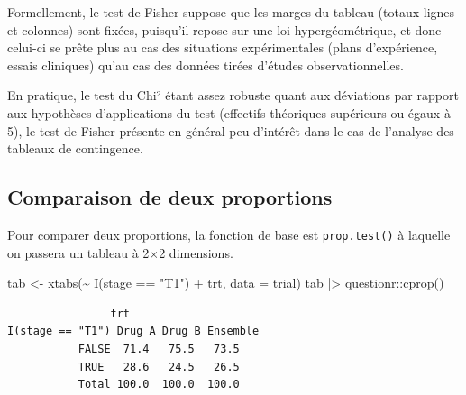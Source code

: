 \documentclass[
  letterpaper,
  DIV=11,
  numbers=noendperiod,
  oneside]{scrreprt}
\newenvironment{Shaded}{\begin{snugshade}}{\end{snugshade}}
\newcommand{\AttributeTok}[1]{\textcolor[rgb]{0.40,0.45,0.13}{#1}}
\newcommand{\FunctionTok}[1]{\textcolor[rgb]{0.28,0.35,0.67}{#1}}
\newcommand{\NormalTok}[1]{\textcolor[rgb]{0.00,0.23,0.31}{#1}}
\newcommand{\OtherTok}[1]{\textcolor[rgb]{0.00,0.23,0.31}{#1}}
\newcommand{\SpecialCharTok}[1]{\textcolor[rgb]{0.37,0.37,0.37}{#1}}
\newcommand{\StringTok}[1]{\textcolor[rgb]{0.13,0.47,0.30}{#1}}
\begin{document}
\begin{tcolorbox}[enhanced jigsaw, colbacktitle=quarto-callout-note-color!10!white, opacityback=0, toprule=.15mm, colback=white, coltitle=black, bottomtitle=1mm, toptitle=1mm, titlerule=0mm, rightrule=.15mm, title=\textcolor{quarto-callout-note-color}{\faInfo}\hspace{0.5em}{Note}, breakable, bottomrule=.15mm, opacitybacktitle=0.6, arc=.35mm, left=2mm, leftrule=.75mm, colframe=quarto-callout-note-color-frame]

Formellement, le test de Fisher suppose que les marges du tableau
(totaux lignes et colonnes) sont fixées, puisqu'il repose sur une loi
hypergéométrique, et donc celui-ci se prête plus au cas des situations
expérimentales (plans d'expérience, essais cliniques) qu'au cas des
données tirées d'études observationnelles.

En pratique, le test du Chi² étant assez robuste quant aux déviations
par rapport aux hypothèses d'applications du test (effectifs théoriques
supérieurs ou égaux à 5), le test de Fisher présente en général peu
d'intérêt dans le cas de l'analyse des tableaux de contingence.

\end{tcolorbox}

\hypertarget{comparaison-de-deux-proportions}{%
\subsection{Comparaison de deux
proportions}\label{comparaison-de-deux-proportions}}

Pour comparer deux proportions, la fonction de base est
\texttt{prop.test()} à laquelle on passera un tableau à 2×2 dimensions.

\begin{Shaded}
\begin{Highlighting}[]
\NormalTok{tab }\OtherTok{\textless{}{-}} \FunctionTok{xtabs}\NormalTok{(}\SpecialCharTok{\textasciitilde{}} \FunctionTok{I}\NormalTok{(stage }\SpecialCharTok{==} \StringTok{"T1"}\NormalTok{) }\SpecialCharTok{+}\NormalTok{ trt, }\AttributeTok{data =}\NormalTok{ trial)}
\NormalTok{tab }\SpecialCharTok{|\textgreater{}}\NormalTok{ questionr}\SpecialCharTok{::}\FunctionTok{cprop}\NormalTok{()}
\end{Highlighting}
\end{Shaded}

\begin{verbatim}
                trt
I(stage == "T1") Drug A Drug B Ensemble
           FALSE  71.4   75.5   73.5   
           TRUE   28.6   24.5   26.5   
           Total 100.0  100.0  100.0   
\end{verbatim}
\end{document}
